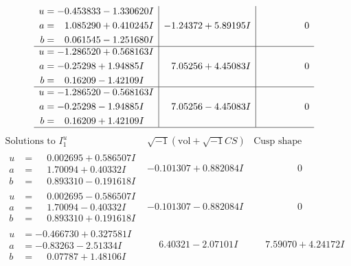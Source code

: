 \documentclass[1p]{elsarticle_modified}
\theoremstyle{definition}
\newcommand{\I}{\sqrt{-1}}
\begin{document}
$$\begin{array}{c|c|c}
\begin{aligned}
u &= -0.453833 - 1.330620 I \\
a &= \phantom{-}1.085290 + 0.410245 I \\
b &= \phantom{-}0.061545 - 1.251680 I\end{aligned}
 & -1.24372 + 5.89195 I & \phantom{-0.000000 } 0 \\ \hline\begin{aligned}
u &= -1.286520 + 0.568163 I \\
a &= -0.25298 + 1.94885 I \\
b &= \phantom{-}0.16209 - 1.42109 I\end{aligned}
 & \phantom{-}7.05256 + 4.45083 I & \phantom{-0.000000 } 0 \\ \hline\begin{aligned}
u &= -1.286520 - 0.568163 I \\
a &= -0.25298 - 1.94885 I \\
b &= \phantom{-}0.16209 + 1.42109 I\end{aligned}
 & \phantom{-}7.05256 - 4.45083 I & \phantom{-0.000000 } 0\\
 \hline 
 \end{array}$$\newpage$$\begin{array}{c|c|c}  
\text{Solutions to }I^u_{1}& \I (\text{vol} + \sqrt{-1}CS) & \text{Cusp shape}\\
 \hline 
\begin{aligned}
u &= \phantom{-}0.002695 + 0.586507 I \\
a &= \phantom{-}1.70094 + 0.40332 I \\
b &= \phantom{-}0.893310 - 0.191618 I\end{aligned}
 & -0.101307 + 0.882084 I & \phantom{-0.000000 } 0 \\ \hline\begin{aligned}
u &= \phantom{-}0.002695 - 0.586507 I \\
a &= \phantom{-}1.70094 - 0.40332 I \\
b &= \phantom{-}0.893310 + 0.191618 I\end{aligned}
 & -0.101307 - 0.882084 I & \phantom{-0.000000 } 0 \\ \hline\begin{aligned}
u &= -0.466730 + 0.327581 I \\
a &= -0.83263 - 2.51334 I \\
b &= \phantom{-}0.07787 + 1.48106 I\end{aligned}
 & \phantom{-}6.40321 - 2.07101 I & \phantom{-}7.59070 + 4.24172 I \\ \hline\begin{aligned}

\end{aligned}
\end{array}$$
\end{document}
